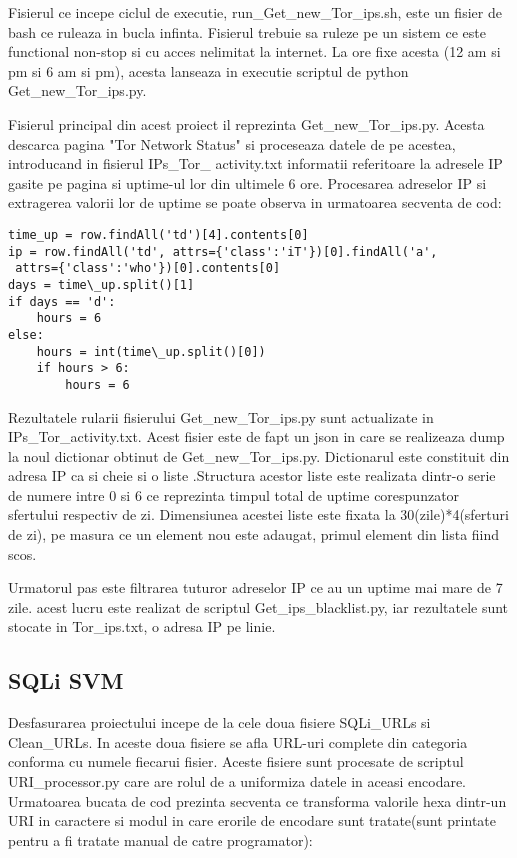 Fisierul ce incepe ciclul de executie, run\_Get\_new\_Tor\_ips.sh, este un fisier de bash ce ruleaza in bucla infinta. Fisierul trebuie sa ruleze pe un sistem ce este functional non-stop si cu acces nelimitat la internet. La ore fixe acesta (12 am si pm si 6 am si pm), acesta lanseaza in executie scriptul de python Get\_new\_Tor\_ips.py.

Fisierul principal din acest proiect il reprezinta Get\_new\_Tor\_ips.py. Acesta descarca pagina "Tor Network Status" \cite{tot_status} si proceseaza datele de pe acestea, introducand in fisierul IPs\_Tor\_ activity.txt informatii referitoare la adresele IP gasite pe pagina si uptime-ul lor din ultimele 6 ore. Procesarea adreselor IP si extragerea valorii lor de uptime se poate observa in urmatoarea secventa de cod:

\lstset{language=python,frame=single, showstringspaces=false}
\begin{lstlisting}
time_up = row.findAll('td')[4].contents[0]
ip = row.findAll('td', attrs={'class':'iT'})[0].findAll('a',
 attrs={'class':'who'})[0].contents[0]
days = time\_up.split()[1]
if days == 'd':
    hours = 6
else:
    hours = int(time\_up.split()[0])
    if hours > 6:
        hours = 6

\end{lstlisting}

Rezultatele rularii fisierului Get\_new\_Tor\_ips.py sunt actualizate in IPs\_Tor\_activity.txt. Acest fisier este de fapt un json in care se realizeaza dump la noul dictionar obtinut de  Get\_new\_Tor\_ips.py. Dictionarul este constituit din adresa IP ca si cheie si o liste .Structura acestor liste este realizata dintr-o serie de numere intre 0 si 6 ce reprezinta timpul total de uptime corespunzator sfertului respectiv de zi. Dimensiunea acestei liste este fixata la 30(zile)*4(sferturi de zi), pe masura ce un element nou este adaugat, primul element din lista fiind scos.

Urmatorul pas este filtrarea tuturor adreselor IP ce au un uptime mai mare de 7 zile. acest lucru este realizat de scriptul Get\_ips\_blacklist.py, iar rezultatele sunt stocate in Tor\_ips.txt, o adresa IP pe linie.

\subsection{SQLi SVM}
Desfasurarea proiectului incepe de la cele doua fisiere SQLi\_URLs si Clean\_URLs. In aceste doua fisiere se afla URL-uri complete din categoria conforma cu numele fiecarui fisier. Aceste fisiere sunt procesate de scriptul URI\_processor.py care are rolul de a uniformiza datele in aceasi encodare. Urmatoarea bucata de cod prezinta secventa ce transforma valorile hexa dintr-un URI in caractere si modul in care erorile de encodare sunt tratate(sunt printate pentru a fi tratate manual de catre programator):

